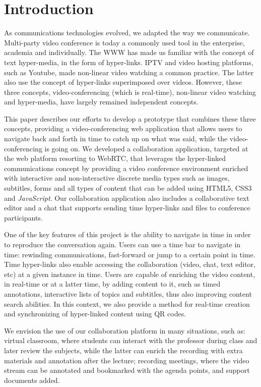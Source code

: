 \documentclass[10pt,conference]{IEEEtran}
\begin{document}
\section{Introduction}
\label{chapter:introduction}


As communications technologies evolved, we adapted the way we communicate. 
Multi-party video conference is today a commonly used tool in the enterprise, academia and individually.
The \gls{WWW} has made us familiar with the concept of text hyper-media, in the form of hyper-links.
\gls{IPTV} and video hosting platforms, such as Youtube, made non-linear video watching a common practice.
The latter also use the concept of hyper-links superimposed over videos.
However, these three concepts, video-conferencing (which is real-time), non-linear video watching and hyper-media, have largely remained independent concepts.

This paper describes our efforts to develop a prototype that combines these three concepts, providing a video-conferencing web application that allows users to navigate back and forth in time to catch up on what was said, while the video-conferencing is going on.
We developed a collaboration application, targeted at the web platform resorting to \gls{WebRTC}, that leverages the hyper-linked communications concept by providing a video conference environment enriched with interactive and non-interactive discrete media types such as images, subtitles, forms and all types of content that can be added using \gls{HTML}5, \gls{CSS}3 and \emph{JavaScript}.
Our collaboration application also includes a collaborative text editor and a chat that supports sending time hyper-links and files to conference participants.

One of the key features of this project is the ability to navigate in time in order to reproduce the conversation again.
Users can use a time bar to navigate in time: rewinding communications, fast-forward or jump to a certain point in time.
Time hyper-links also enable accessing the collaboration (video, chat, text editor, etc) at a given instance in time.
Users are capable of enriching the video content, in real-time or at a latter time, by adding content to it, such as timed annotations, interactive lists of topics and subtitles, thus also improving content search abilities.
In this context, we also provide a method for real-time creation and synchronizing of hyper-linked content using \gls{QR} codes.

We envision the use of our collaboration platform in many situations, such as: virtual classroom, where students can interact with the professor during class and later review the subjects, while the latter can enrich the recording with extra materials and annotation after the lecture; recording meetings, where the video stream can be annotated and bookmarked with the agenda points, and support documents added.
\end{document}
